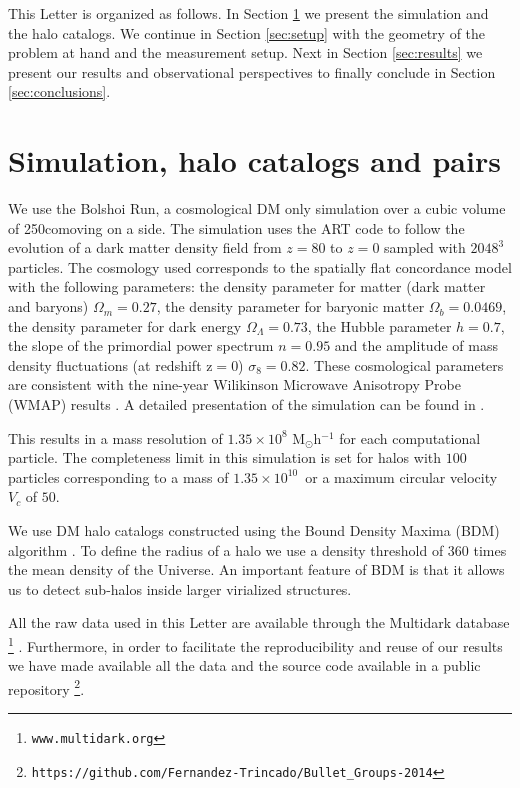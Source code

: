 \documentclass{emulateapj}
\newcommand{\hMpc}{{\ifmmode{h^{-1}{\rm Mpc}}\else{$h^{-1}$Mpc }\fi}}
\newcommand{\hMsun}{{\ifmmode{h^{-1}{\rm {M_{\odot}}}}\else{$h^{-1}{\rm{M_{\odot}}}$}\fi}}
\newcommand{\kms}{{\ifmmode{{\mathrm{\,km\ s}^{-1}}}\else{\,km~s$^{-1}$}\fi}}
\begin{document}
This Letter is organized as follows. In Section
\ref{sec:simulation} we present the simulation and the halo
catalogs. We continue in Section \ref{sec:setup} with the  geometry of
the problem at hand and the measurement setup. Next in   Section
\ref{sec:results} we present our results and observational
perspectives to finally conclude in Section \ref{sec:conclusions}.  

\section{Simulation, halo catalogs and pairs}
\label{sec:simulation}

We use the Bolshoi Run, a cosmological DM only simulation over a cubic
volume of 250\hMpc comoving on a side. The simulation uses the ART
code \citep{Kravtsov1997} to follow the evolution of a dark matter
density field from $z=80$ to $z=0$ sampled with $2048^3$  particles. The
cosmology used  corresponds to  the spatially flat concordance model
with the following parameters:  the density parameter for matter (dark
matter and baryons) $\Omega_m=0.27$, the density parameter for baryonic matter
$\Omega_b=0.0469$, the density parameter for dark energy
$\Omega_{\Lambda}=0.73$, the Hubble parameter $h=0.7$, the
slope of the primordial power spectrum $n=0.95$ and the amplitude of mass
density fluctuations (at redshift z$=$0) $\sigma_8=0.82$.  These
cosmological parameters are consistent with the nine-year Wilikinson
Microwave Anisotropy Probe (WMAP) results \citep{hinshaw_etal13}. A
detailed presentation of the simulation can be found in
\citet{2011ApJ...740..102K}. 

This results in a mass resolution of $1.35 \times 10^8$
M$_{\odot}$h$^{-1}$ for each computational particle. The completeness
limit in this simulation is set for halos with $100$ particles
corresponding to a mass of $1.35\times10^{10}$\hMsun\ or a maximum
circular velocity $V_{c}$ of $50$\kms. 

We use DM halo catalogs constructed using the Bound Density Maxima (BDM)
algorithm \citep{BDM,BDMb}. To define the radius of a halo we use a
density threshold of 360 times the mean density of the Universe. An
important feature of BDM is that it allows us to detect sub-halos
inside larger virialized structures.     

All the raw data used in this Letter are available through the
Multidark database \footnote{\texttt{www.multidark.org}}
\citep{Riebe2013}.  Furthermore, in order to facilitate the
reproducibility and reuse of our results we have made available all
the data and the source code available in a public
repository \footnote{\texttt{https://github.com/Fernandez-Trincado/Bullet\_Groups-2014}}. 
 
\end{document}
